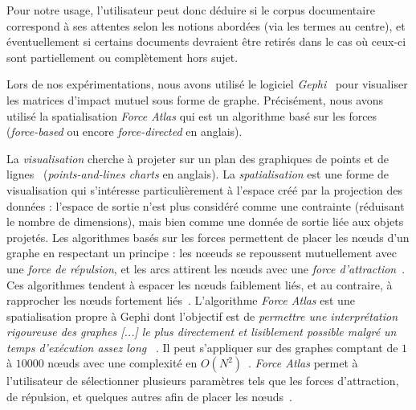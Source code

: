 \bigskip

Pour notre usage, l'utilisateur peut donc déduire si le corpus documentaire correspond à ses attentes selon les notions abordées (via les termes au centre), et éventuellement si certains documents devraient être retirés dans le cas où ceux-ci sont partiellement ou complètement hors sujet.

\bigskip

Lors de nos expérimentations, nous avons utilisé le logiciel \textit{Gephi}~\cite{bastian2009gephi} pour visualiser les matrices d'impact mutuel sous forme de graphe.
Précisément, nous avons utilisé la spatialisation \textit{Force Atlas} qui est un algorithme basé sur les forces~\cite{venturini2021we} (\og \textit{force-based} \fg ou encore \og \textit{force-directed} \fg en anglais).

La \textit{visualisation} cherche à projeter sur un plan des graphiques de points et de lignes~\cite{venturini2021we} (\og \textit{points-and-lines charts} \fg en anglais).
La \textit{spatialisation} est une forme de visualisation qui s'intéresse particulièrement à l'espace créé par la projection des données : l'espace de sortie n'est plus considéré comme une contrainte (réduisant le nombre de dimensions), mais bien comme une donnée de sortie liée aux objets projetés.
Les algorithmes basés sur les forces permettent de placer les n\oe{}uds d'un graphe en respectant un principe : les n\oe{}euds se repoussent mutuellement avec une \textit{force de répulsion}, et les arcs attirent les n\oe{}uds avec une \textit{force d'attraction}~\cite{venturini2021we}.
Ces algorithmes tendent à espacer les n\oe{}uds faiblement liés, et au contraire, à rapprocher les n\oe{}uds fortement liés~\cite{venturini2021we}.
L'algorithme \textit{Force Atlas} est une spatialisation propre à Gephi dont l'objectif est de \og \textit{permettre une interprétation rigoureuse des graphes [...] le plus directement et lisiblement possible malgré un temps d'exécution assez long} \fg~\cite{gephi2016spatialisationFR}.
Il peut s'appliquer sur des graphes comptant de $ 1 $ à $ 10000 $ n\oe{}uds avec une complexité en $ O(N^2) $~\cite{gephi2011tutoriallayout}\cite{gephi2016spatialisationFR}.
\textit{Force Atlas} permet à l'utilisateur de sélectionner plusieurs paramètres tels que les forces d'attraction, de répulsion, et quelques autres afin de placer les n\oe{}uds~\cite{jacomy2014forceatlas2}.
%
%


